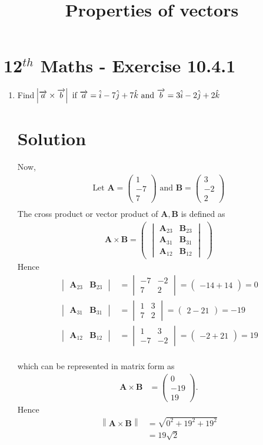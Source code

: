 \documentclass[12pt]{article}
\newcommand{\mydet}[1]{\ensuremath{\begin{vmatrix}#1\end{vmatrix}}}
\providecommand{\norm}[1]{\left\lVert#1\right\rVert}
\newcommand{\myvec}[1]{\ensuremath{\begin{pmatrix}#1\end{pmatrix}}}
\let\vec\mathbf
\begin{document}
\begin{center}
\title{\textbf{Properties of vectors}}
\date{\vspace{-5ex}} %
\maketitle
\end{center}
\setcounter{page}{1}
\section{12$^{th}$ Maths - Exercise 10.4.1}

\begin{enumerate}
\item Find $\abs{\overrightarrow{a}\times\overrightarrow{b}}\text{ if }\overrightarrow{a}=\hat{i}-7\hat{j}+7\hat{k}\text{ and }\overrightarrow{b}=3\hat{i}-2\hat{j}+2\hat{k}$
\section{Solution}
Now,
\begin{align}
\text{Let } \vec{A} = \myvec{1\\-7\\7} \text{ and } \vec{B} = \myvec{3\\ -2 \\ 2}\\
\end{align}
The cross product or vector product of $\vec{A},\vec{B}$ is defined as
\begin{align}
	\vec{A} \times \vec{B} = \myvec{\mydet{\vec{A}_{23}&\vec{B}_{23}\\\vec{A}_{31}&\vec{B}_{31}\\\vec{A}_{12}&\vec{B}_{12}}}
\end{align}
Hence
\begin{align}
	\mydet{\vec{A}_{23}&\vec{B}_{23}}&=\mydet{-7&-2\\7&2}=\myvec{-14+14}=0\\
	\mydet{\vec{A}_{31}&\vec{B}_{31}}&=\mydet{1&3\\7&2}=\myvec{2-21}=-19\\
	\mydet{\vec{A}_{12}&\vec{B}_{12}}&=\mydet{1&3\\-7&-2}=\myvec{-2+21}=19\\
\end{align}

which can be represented in matrix form as
\begin{align}
	\vec{A} \times \vec{B}&=\myvec{0\\-19\\19}.
\end{align}
Hence
\begin{align}
\norm{\vec{A} \times \vec{B}}&=\sqrt{0^2+19^2+19^2}\\
 &= 19\sqrt{2}\\
\end{align}

\end{enumerate}
\end{document}
